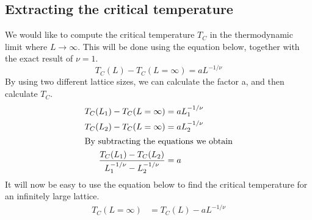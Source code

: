 \documentclass[../main.tex]{subfiles}
\begin{document}
\subsection{Extracting the critical temperature}
We would like to compute the critical temperature $T_C$ in the thermodynamic limit where $L \rightarrow \infty$. This will be done using the equation below, together with the exact result of $\nu = 1$.
\[T_C(L) - T_C(L = \infty) = aL^{-1/\nu}\]
By using two different lattice sizes, we can calculate the factor a, and then calculate  $T_C$.
\begin{align}
  T_C(L_1) - T_C(L = \infty) &= aL_1^{-1/\nu} \nonumber\\
  T_C(L_2) - T_C(L = \infty) &= aL_2^{-1/\nu} \nonumber\\
  \intertext{By subtracting the equations we obtain}
  \frac{T_C(L_1) - T_C(L_2)}{L_1^{-1/\nu} - L_2^{-1/\nu}} &= a \label{eq:a}
\end{align}
It will now be easy to use the equation below to find the critical temperature for an infinitely large lattice.
\begin{align}
T_C(L = \infty) &= T_C(L) - aL^{-1/\nu} \label{eq:TC}
\end{align}
\end{document}
